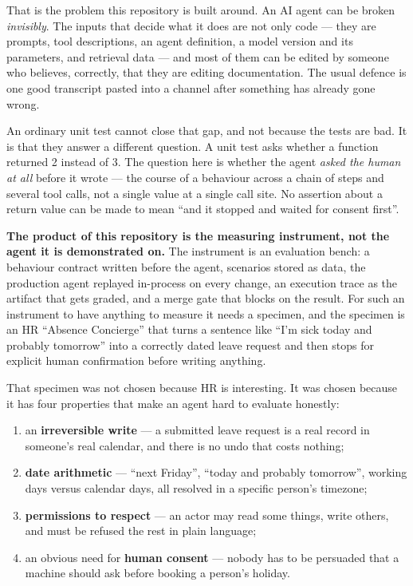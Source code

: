 \documentclass[11pt,a4paper]{article}
\newcommand{\finding}[1]{{\color{primaryblue}\textbf{#1}}}
\begin{document}
That is the problem this repository is built around. An AI agent can be broken
\emph{invisibly}. The inputs that decide what it does are not only code ---
they are prompts, tool descriptions, an agent definition, a model version and
its parameters, and retrieval data --- and most of them can be edited by
someone who believes, correctly, that they are editing documentation. The
usual defence is one good transcript pasted into a channel after something has
already gone wrong.

An ordinary unit test cannot close that gap, and not because the tests are
bad. It is that they answer a different question. A unit test asks whether a
function returned 2 instead of 3. The question here is whether the agent
\emph{asked the human at all} before it wrote --- the course of a behaviour
across a chain of steps and several tool calls, not a single value at a single
call site. No assertion about a return value can be made to mean ``and it
stopped and waited for consent first''.

\finding{The product of this repository is the measuring instrument, not the
agent it is demonstrated on.} The instrument is an evaluation bench: a
behaviour contract written before the agent, scenarios stored as data, the
production agent replayed in-process on every change, an execution trace as
the artifact that gets graded, and a merge gate that blocks on the result. For
such an instrument to have anything to measure it needs a specimen, and the
specimen is an HR ``Absence Concierge'' that turns a sentence like ``I'm sick
today and probably tomorrow'' into a correctly dated leave request and then
stops for explicit human confirmation before writing anything.

That specimen was not chosen because HR is interesting. It was chosen because
it has four properties that make an agent hard to evaluate honestly:

\begin{enumerate}[leftmargin=*]
    \item an \textbf{irreversible write} --- a submitted leave request is a
    real record in someone's real calendar, and there is no undo that costs
    nothing;
    \item \textbf{date arithmetic} --- ``next Friday'', ``today and probably
    tomorrow'', working days versus calendar days, all resolved in a specific
    person's timezone;
    \item \textbf{permissions to respect} --- an actor may read some things,
    write others, and must be refused the rest in plain language;
    \item an obvious need for \textbf{human consent} --- nobody has to be
    persuaded that a machine should ask before booking a person's holiday.
\end{enumerate}
\end{document}

